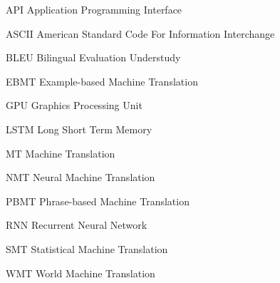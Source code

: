 \newcommand{\abbrlabel}[1]{\makebox[3cm][l]{\textbf{#1}}}
\newenvironment{abbreviations}{\begin{list}{}{\renewcommand{\makelabel}{\abbrlabel}}}{\end{list}}
\begin{abbreviations}
	\item[API] Application Programming Interface
	\item[ASCII] American Standard Code For Information Interchange
	\item[BLEU] Bilingual Evaluation Understudy
	\item[EBMT] Example-based Machine Translation
	\item[GPU] Graphics Processing Unit
	\item[LSTM] Long Short Term Memory
	\item[MT] Machine Translation
	\item[NMT] Neural Machine Translation
	\item[PBMT] Phrase-based Machine Translation
	\item[RNN] Recurrent Neural Network
	\item[SMT] Statistical Machine Translation
	\item[WMT] World Machine Translation
\end{abbreviations}


